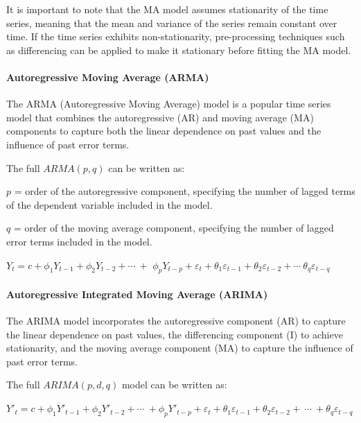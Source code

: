 \documentclass[
]{article}
\begin{document}
It is important to note that the MA model assumes stationarity of the
time series, meaning that the mean and variance of the series remain
constant over time. If the time series exhibits non-stationarity,
pre-processing techniques such as differencing can be applied to make it
stationary before fitting the MA model.

\hypertarget{autoregressive-moving-average-arma}{%
\paragraph{Autoregressive Moving Average
(ARMA)}\label{autoregressive-moving-average-arma}}

The ARMA (Autoregressive Moving Average) model is a popular time series
model that combines the autoregressive (AR) and moving average (MA)
components to capture both the linear dependence on past values and the
influence of past error terms.

The full \(ARMA(p,q)\) can be written as:

\(p\) = order of the autoregressive component, specifying the number of
lagged terms of the dependent variable included in the model.

\(q\) = order of the moving average component, specifying the number of
lagged error terms included in the model.

\(Y_{t} = c + \phi_{1}Y_{t - 1} + \phi_{2}Y_{t - 2} + \cdots\  +\)
\(\phi_{p}Y_{t - p} + \varepsilon_{t} + \theta_{1}\varepsilon_{t - 1} + \theta_{2}\varepsilon_{t - 2} + \cdots\ \theta_{q}\varepsilon_{t - q}\)

\hypertarget{autoregressive-integrated-moving-average-arima}{%
\paragraph{Autoregressive Integrated Moving Average
(ARIMA)}\label{autoregressive-integrated-moving-average-arima}}

The ARIMA model incorporates the autoregressive component (AR) to
capture the linear dependence on past values, the differencing component
(I) to achieve stationarity, and the moving average component (MA) to
capture the influence of past error terms.

The full \(ARIMA (p,d,q)\) model can be written as:

\(Y'_{t} = c + \phi_{1}{Y'}_{t - 1} + \phi_{2}{Y'}_{t - 2} + \cdots\  + \phi_{p}{Y'}_{t - p} + \varepsilon_{t} + \theta_{1}\varepsilon_{t - 1} + \theta_{2}\varepsilon_{t - 2} + \  \cdots \  + \theta_{q}\varepsilon_{t - q}\)
\end{document}
